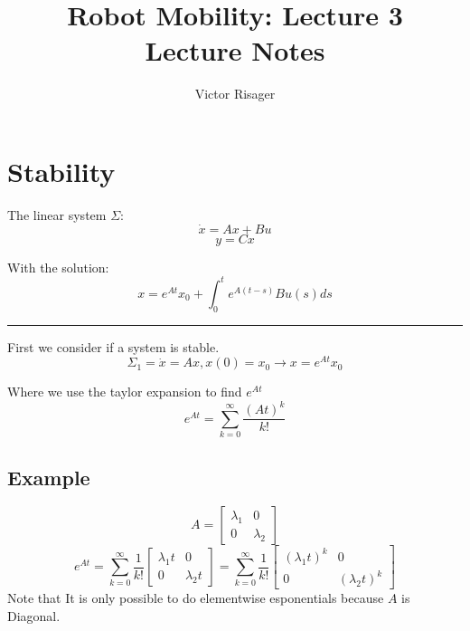 \documentclass[a4paper]{article}
\title{Robot Mobility: Lecture 3 \\
	\large Lecture Notes}
\author{Victor Risager}
\begin{document}
\maketitle
\section{Stability}

The linear system $ \Sigma $:
\begin{equation}
\dot{x} = Ax + Bu
\end{equation}
\begin{equation}
y = Cx 
\end{equation}

With the solution:
\begin{equation}
	x = e^{At} x_0 + \int_{0}^{t} e^{A(t-s)} B u(s) ds  
\end{equation}

\vspace{5pt}
\hrule
\vspace{5pt}

First we consider if a system is stable. 
\begin{equation}\label{eq1}
\Sigma_1 = \dot{x} = Ax, x(0) = x_0 \rightarrow x=e^{At} x_0
\end{equation}

Where we use the taylor expansion to find $ e^{At}  $
\begin{equation}
	e^{At} = \sum_{k=0}^{\infty}{\frac{(At)^{k}}{k!} }
\end{equation}

\subsection{Example}
\begin{equation}
A = \begin{bmatrix}
\lambda_1 & 0 \\
0 & \lambda_2
\end{bmatrix}
\end{equation}
\begin{equation}
	e^{At} = \sum_{k=0}^{\infty}{\frac{1}{k!} \begin{bmatrix}
	\lambda_1 t & 0 \\
	0 & \lambda_2 t
	\end{bmatrix}} = \sum_{k=0}^{\infty}{\frac{1}{k!} \begin{bmatrix}
	(\lambda_1t)^{k}  & 0 \\
	0 & (\lambda_2t)^{k}
	\end{bmatrix}}
\end{equation}
Note that It is only possible to do elementwise esponentials because $ A $ is Diagonal.
\end{document}
